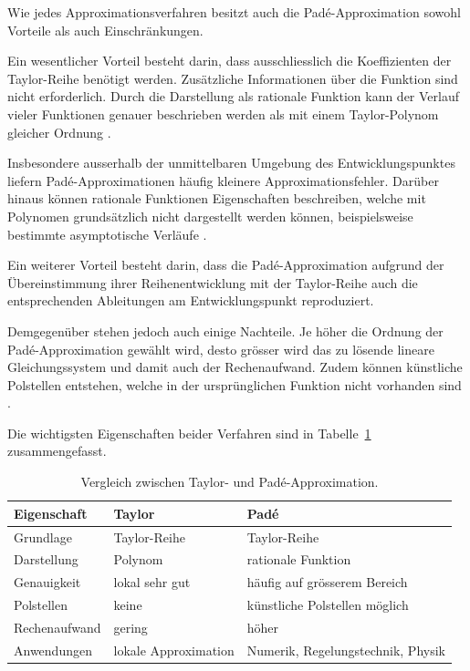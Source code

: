 Wie jedes Approximationsverfahren besitzt auch die Padé-Approximation sowohl Vorteile als auch Einschränkungen.

Ein wesentlicher Vorteil besteht darin, dass ausschliesslich die Koeffizienten der Taylor-Reihe benötigt werden. Zusätzliche Informationen über die Funktion sind nicht erforderlich. Durch die Darstellung als rationale Funktion kann der Verlauf vieler Funktionen genauer beschrieben werden als mit einem Taylor-Polynom gleicher Ordnung \cite{baker_graves_morris_1996}.

Insbesondere ausserhalb der unmittelbaren Umgebung des Entwicklungspunktes liefern Padé-Approximationen häufig kleinere Approximationsfehler. Darüber hinaus können rationale Funktionen Eigenschaften beschreiben, welche mit Polynomen grundsätzlich nicht dargestellt werden können, beispielsweise bestimmte asymptotische Verläufe \cite{baker_graves_morris_1996}.

Ein weiterer Vorteil besteht darin, dass die Padé-Approximation aufgrund der Übereinstimmung ihrer Reihenentwicklung mit der Taylor-Reihe auch die entsprechenden Ableitungen am Entwicklungspunkt reproduziert.

Demgegenüber stehen jedoch auch einige Nachteile. Je höher die Ordnung der Padé-Approximation gewählt wird, desto grösser wird das zu lösende lineare Gleichungssystem und damit auch der Rechenaufwand. Zudem können künstliche Polstellen entstehen, welche in der ursprünglichen Funktion nicht vorhanden sind \cite{baker_graves_morris_1996}.

Die wichtigsten Eigenschaften beider Verfahren sind in Tabelle~\ref{pade:tab:vor_nachteile} zusammengefasst.

\begin{table}
	\centering
	\begin{tabular}{lll}
		\hline
		Eigenschaft   & Taylor               & Padé\\
		\hline
		Grundlage     & Taylor-Reihe          & Taylor-Reihe\\
		Darstellung   & Polynom              & rationale Funktion\\
		Genauigkeit   & lokal sehr gut       & häufig auf grösserem Bereich\\
		Polstellen    & keine                & künstliche Polstellen möglich\\
		Rechenaufwand & gering               & höher\\
		Anwendungen   & lokale Approximation & Numerik, Regelungstechnik, Physik\\
		\hline
	\end{tabular}
	\caption{Vergleich zwischen Taylor- und Padé-Approximation.}
	\label{pade:tab:vor_nachteile}
\end{table}
